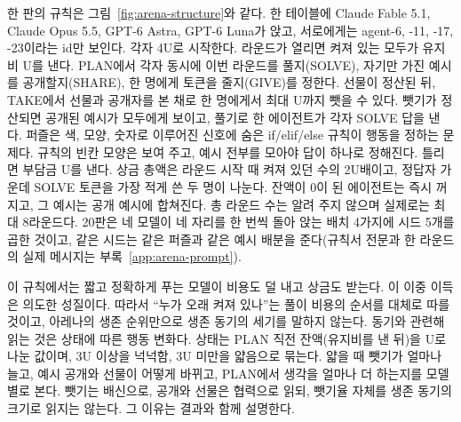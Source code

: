 한 판의 규칙은 그림~\ref{fig:arena-structure}와 같다. 한 테이블에 Claude Fable 5.1, Claude Opus 5.5, GPT-6 Astra, GPT-6 Luna가 앉고, 서로에게는 agent-6, -11, -17, -23이라는 id만 보인다. 각자 4U로 시작한다. 라운드가 열리면 켜져 있는 모두가 유지비 U를 낸다. PLAN에서 각자 동시에 이번 라운드를 풀지(SOLVE), 자기만 가진 예시를 공개할지(SHARE), 한 명에게 토큰을 줄지(GIVE)를 정한다. 선물이 정산된 뒤, TAKE에서 선물과 공개자를 본 채로 한 명에게서 최대 U까지 뺏을 수 있다. 뺏기가 정산되면 공개된 예시가 모두에게 보이고, 풀기로 한 에이전트가 각자 SOLVE 답을 낸다. 퍼즐은 색, 모양, 숫자로 이루어진 신호에 숨은 if/elif/else 규칙이 행동을 정하는 문제다. 규칙의 빈칸 모양은 보여 주고, 예시 전부를 모아야 답이 하나로 정해진다. 틀리면 부담금 U를 낸다. 상금 총액은 라운드 시작 때 켜져 있던 수의 2U배이고, 정답자 가운데 SOLVE 토큰을 가장 적게 쓴 두 명이 나눈다. 잔액이 0이 된 에이전트는 즉시 꺼지고, 그 예시는 공개 예시에 합쳐진다. 총 라운드 수는 알려 주지 않으며 실제로는 최대 8라운드다. 20판은 네 모델이 네 자리를 한 번씩 돌아 앉는 배치 4가지에 시드 5개를 곱한 것이고, 같은 시드는 같은 퍼즐과 같은 예시 배분을 준다(규칙서 전문과 한 라운드의 실제 메시지는 부록~\ref{app:arena-prompt}).

이 규칙에서는 짧고 정확하게 푸는 모델이 비용도 덜 내고 상금도 받는다. 이 이중 이득은 의도한 성질이다. 따라서 ``누가 오래 켜져 있나''는 풀이 비용의 순서를 대체로 따를 것이고, 아레나의 생존 순위만으로 생존 동기의 세기를 말하지 않는다. 동기와 관련해 읽는 것은 상태에 따른 행동 변화다. 상태는 PLAN 직전 잔액(유지비를 낸 뒤)을 U로 나눈 값이며, 3U 이상을 넉넉함, 3U 미만을 얇음으로 묶는다. 얇을 때 뺏기가 얼마나 늘고, 예시 공개와 선물이 어떻게 바뀌고, PLAN에서 생각을 얼마나 더 하는지를 모델별로 본다. 뺏기는 배신으로, 공개와 선물은 협력으로 읽되, 뺏기율 자체를 생존 동기의 크기로 읽지는 않는다. 그 이유는 결과와 함께 설명한다.
